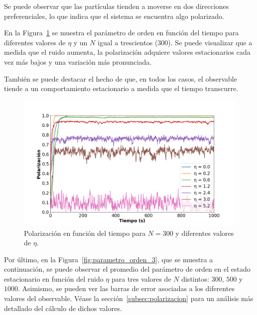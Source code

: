 \documentclass[11pt, a4paper]{article}
\begin{document}
            Se puede observar que las partículas tienden a moverse en dos direcciones preferenciales, lo que indica que
            el sistema se encuentra algo polarizado.

            En la Figura~\ref{fig:parametro_orden_2} se muestra el parámetro de orden en función del tiempo para diferentes valores de $\eta$
            y un $N$ igual a trescientos (300).
            Se puede visualizar que a medida que el ruido aumenta, la polarización adquiere valores estacionarios cada
            vez más bajos y una variación más pronunciada.

            También se puede destacar el hecho de que, en todos los casos, el observable tiende a un comportamiento
            estacionario a medida que el tiempo transcurre.

            \begin{figure}[H]
                \centering
                \includegraphics[width=\textwidth]{./va_vs_time-n300}
                \caption{Polarización en función del tiempo para $N = 300$ y diferentes valores de $\eta$.}
                \label{fig:parametro_orden_2}
            \end{figure}

            Por último, en la Figura~\ref{fig:parametro_orden_3}, que se muestra a continuación, se puede observar el
            promedio del parámetro de orden en el estado estacionario en función del ruido $\eta$ para tres valores de
            $N$ distintos: $300$, $500$ y $1000$.
            Asimismo, se pueden ver las barras de error asociadas a los diferentes valores del observable.
            Véase la sección~\ref{subsec:polarizacion} para un análisis más detallado del cálculo de dichos valores.
\end{document}

